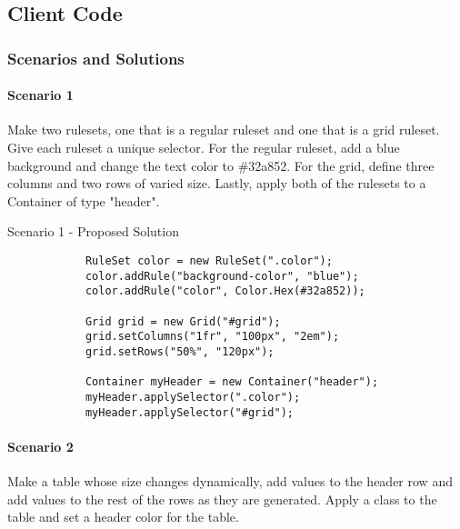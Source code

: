 \documentclass[12pt]{article}
\begin{document}
    \subsection{Client Code}

        \subsubsection{Scenarios and Solutions}

        \paragraph{Scenario 1}
        Make two rulesets, one that is a regular ruleset and one that is a grid ruleset. Give each ruleset a unique selector. For the regular ruleset, add a blue background and change the text color to \#32a852. For the grid, define three columns and two rows of varied size. Lastly, apply both of the rulesets to a Container of type "header".
        
        \begin{shaded}
            Scenario 1 - Proposed Solution
            \begin{lstlisting}
            RuleSet color = new RuleSet(".color");
            color.addRule("background-color", "blue");
            color.addRule("color", Color.Hex(#32a852));

            Grid grid = new Grid("#grid");
            grid.setColumns("1fr", "100px", "2em");
            grid.setRows("50%", "120px");

            Container myHeader = new Container("header");
            myHeader.applySelector(".color");
            myHeader.applySelector("#grid");
            \end{lstlisting}
        \end{shaded}

        \paragraph{Scenario 2}
        Make a table whose size changes dynamically, add values to the header row and add values to the rest of the rows as they are generated. Apply a class to the table and set a header color for the table.
\end{document}
